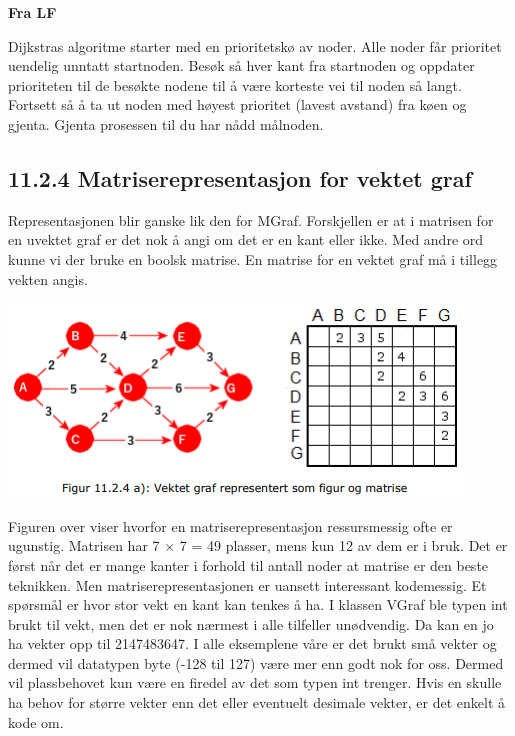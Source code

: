 \documentclass[11pt]{article}
\begin{document}
        \textbf{Fra LF}

            Dijkstras algoritme starter med en prioritetskø av noder. Alle noder får prioritet uendelig
            unntatt startnoden. Besøk så hver kant fra startnoden og oppdater prioriteten til de besøkte
            nodene til å være korteste vei til noden så langt. Fortsett så å ta ut noden med høyest
            prioritet (lavest avstand) fra køen og gjenta. Gjenta prosessen til du har nådd målnoden.

    \subsection{11.2.4 Matriserepresentasjon for vektet graf}
        Representasjonen blir ganske lik den for MGraf. Forskjellen er at i matrisen for en uvektet
        graf er det nok å angi om det er en kant eller ikke. Med andre ord kunne vi der bruke en
        boolsk matrise. En matrise for en vektet graf må i tillegg vekten angis. 

        \includegraphics[center]{f-11.2.4a.png}

        Figuren over viser hvorfor en matriserepresentasjon ressursmessig ofte er ugunstig. Matrisen
        har 7 × 7 = 49 plasser, mens kun 12 av dem er i bruk. Det er først når det er mange kanter i
        forhold til antall noder at matrise er den beste teknikken. Men matriserepresentasjonen er
        uansett interessant kodemessig. Et spørsmål er hvor stor vekt en kant kan tenkes å ha. I
        klassen VGraf ble typen int brukt til vekt, men det er nok nærmest i alle tilfeller unødvendig.
        Da kan en jo ha vekter opp til 2147483647. I alle eksemplene våre er det brukt små vekter
        og dermed vil datatypen byte (-128 til 127) være mer enn godt nok for oss. Dermed vil
        plassbehovet kun være en firedel av det som typen int trenger. Hvis en skulle ha behov for
        større vekter enn det eller eventuelt desimale vekter, er det enkelt å kode om.
\end{document}
